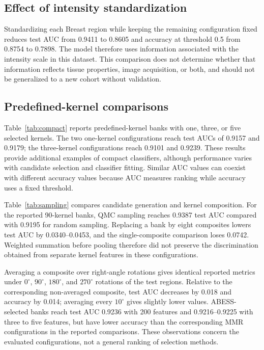 \documentclass[10pt,twocolumn]{article}
\begin{document}
\subsection{Effect of intensity standardization}
\label{sec:results-std}
Standardizing each Breast region while keeping the remaining configuration fixed reduces test AUC from 0.9411 to 0.8605 and accuracy at threshold 0.5 from 0.8754 to 0.7898. The model therefore uses information associated with the intensity scale in this dataset. This comparison does not determine whether that information reflects tissue properties, image acquisition, or both, and should not be generalized to a new cohort without validation.

\subsection{Predefined-kernel comparisons}
Table~\ref{tab:compact} reports predefined-kernel banks with one, three, or five selected kernels. The two one-kernel configurations reach test AUCs of 0.9157 and 0.9179; the three-kernel configurations reach 0.9101 and 0.9239. These results provide additional examples of compact classifiers, although performance varies with candidate selection and classifier fitting. Similar AUC values can coexist with different accuracy values because AUC measures ranking while accuracy uses a fixed threshold.

Table~\ref{tab:sampling} compares candidate generation and kernel composition. For the reported 90-kernel banks, QMC sampling reaches 0.9387 test AUC compared with 0.9195 for random sampling. Replacing a bank by eight composites lowers test AUC by 0.0340--0.0453, and the single-composite comparison loses 0.0742. Weighted summation before pooling therefore did not preserve the discrimination obtained from separate kernel features in these configurations.

Averaging a composite over right-angle rotations gives identical reported metrics under $0^\circ$, $90^\circ$, $180^\circ$, and $270^\circ$ rotations of the test regions. Relative to the corresponding non-averaged composite, test AUC decreases by 0.018 and accuracy by 0.014; averaging every $10^\circ$ gives slightly lower values. ABESS-selected banks reach test AUC 0.9236 with 200 features and 0.9216--0.9225 with three to five features, but have lower accuracy than the corresponding MMR configurations in the reported comparisons. These observations concern the evaluated configurations, not a general ranking of selection methods.
\end{document}
